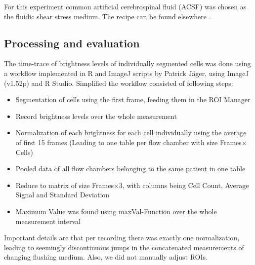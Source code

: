For this experiment common artificial cerebrospinal fluid (ACSF) was chosen as the fluidic shear stress medium. The recipe can be found elsewhere . 

\subsection{Processing and evaluation}
\label{sub:Processing}

The time-trace of brightness levels of individually segmented cells was done using a workflow implemented in R and ImageJ scripts by Patrick Jäger, using ImageJ (v1.52p) and R Studio. Simplified the workflow consisted of following steps:

\begin{itemize}
	\item Segmentation of cells using the first frame, feeding them in the ROI Manager
	\item Record brightness levels over the whole measurement
	\item Normalization of each brightness for each cell individually using the average of first 15 frames (Leading to one table per flow chamber with size Frames$\times$Cells)
	\item Pooled data of all flow chambers belonging to the same patient in one table
	\item Reduce to matrix of size Frames$\times$3, with columns being Cell Count, Average Signal and Standard Deviation
	\item Maximum Value was found using maxVal-Function over the whole measurement interval
\end{itemize}

Important details are that per recording there was exactly one normalization, leading to seemingly discontinuous jumps in the concatenated measurements of changing flushing medium. Also, we did not manually adjust ROIs. 



